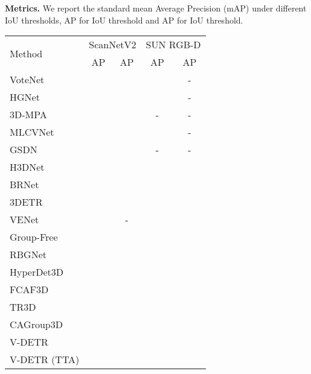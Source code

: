 \documentclass[10pt,twocolumn,letterpaper]{article}
\begin{document}
\vspace{1mm}
\noindent \textbf{Metrics.} We report the standard mean Average Precision (mAP) under different IoU thresholds, \ie AP for  IoU threshold and AP for  IoU threshold. 

\renewcommand{\arraystretch}{1.45}
\begin{table}[!t]
\centering
\footnotesize
\setlength{\tabcolsep}{12pt}
\resizebox{1.0\linewidth}{!}
{
\begin{tabular}{@{}l|cccc}
\multirow{2}{*}{Method} & \multicolumn{2}{c}{ScanNetV2} & \multicolumn{2}{c}{SUN RGB-D} \\ 
& AP & AP & AP & AP \\
\shline
VoteNet~\cite{qi2019deep} &  &  &  & - \\

HGNet~\cite{chen20hgnet} &  &  &  & - \\

3D-MPA~\cite{engelmann203dmpa} &  &  & - & - \\

MLCVNet~\cite{xie2020mlcvnet} &  &  &  & - \\

GSDN~\cite{gwak2020generative} &  &  & - & - \\

H3DNet~\cite{zhang2020h3dnet} &  &  &  &  \\

BRNet~\cite{cheng21brnet} &  &  &  &  \\

3DETR~\cite{misra2021-3detr} &  &  &  &  \\

VENet~\cite{xie21venet} &  & - &  &  \\

Group-Free~\cite{liu2021group} &  &  &  &  \\

RBGNet~\cite{wang22rbgnet} &  &  &  &  \\

HyperDet3D~\cite{zheng22hyperdet3d} &  &  &  &  \\

FCAF3D~\cite{rukhovich2022fcaf3d} &  &  &  &  \\

TR3D~\cite{rukhovich23tr3d} &  &  &  &  \\

CAGroup3D~\cite{wang2022cagroup3d} &  &  &  &  \\
\rowcolor{gray!10}V-DETR &  &  &  &  \\
\rowcolor{gray!10}V-DETR (TTA) &  &  &  &  \\


\end{tabular}}
\end{table}
\end{document}
